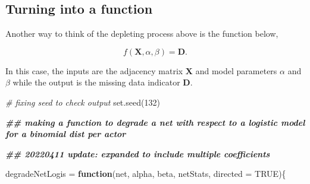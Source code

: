 \documentclass[
]{article}
\newenvironment{Shaded}{\begin{snugshade}}{\end{snugshade}}
\newcommand{\AttributeTok}[1]{\textcolor[rgb]{0.77,0.63,0.00}{#1}}
\newcommand{\CommentTok}[1]{\textcolor[rgb]{0.56,0.35,0.01}{\textit{#1}}}
\newcommand{\ConstantTok}[1]{\textcolor[rgb]{0.00,0.00,0.00}{#1}}
\newcommand{\ControlFlowTok}[1]{\textcolor[rgb]{0.13,0.29,0.53}{\textbf{#1}}}
\newcommand{\DecValTok}[1]{\textcolor[rgb]{0.00,0.00,0.81}{#1}}
\newcommand{\DocumentationTok}[1]{\textcolor[rgb]{0.56,0.35,0.01}{\textbf{\textit{#1}}}}
\newcommand{\FunctionTok}[1]{\textcolor[rgb]{0.00,0.00,0.00}{#1}}
\newcommand{\NormalTok}[1]{#1}
\newcommand{\OtherTok}[1]{\textcolor[rgb]{0.56,0.35,0.01}{#1}}
\begin{document}
\hypertarget{turning-into-a-function}{%
\subsection{Turning into a function}\label{turning-into-a-function}}

Another way to think of the depleting process above is the function
below,

\[f(\mathbf{X}, \alpha, \beta) = \mathbf{D}.\]

In this case, the inputs are the adjacency matrix \(\mathbf{X}\) and
model parameters \(\alpha\) and \(\beta\) while the output is the
missing data indicator \(\mathbf{D}\).

\begin{Shaded}
\begin{Highlighting}[]
\CommentTok{\# fixing seed to check output}
\FunctionTok{set.seed}\NormalTok{(}\DecValTok{132}\NormalTok{)}

\DocumentationTok{\#\# making a function to degrade a net with respect to a logistic model for a binomial dist per actor}

\DocumentationTok{\#\# 20220411 update: expanded to include multiple coefficients}

\NormalTok{degradeNetLogis }\OtherTok{=} \ControlFlowTok{function}\NormalTok{(net, alpha, beta, netStats, }\AttributeTok{directed =} \ConstantTok{TRUE}\NormalTok{)\{}
  

\end{Highlighting}
\end{Shaded}
\end{document}
